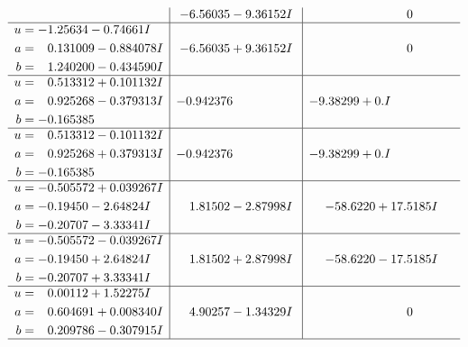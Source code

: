 \documentclass[1p]{elsarticle_modified}
\theoremstyle{definition}
\begin{document}
$$\begin{array}{c|c|c}
 & -6.56035 - 9.36152 I & \phantom{-0.000000 } 0 \\ \hline\begin{aligned}
u &= -1.25634 - 0.74661 I \\
a &= \phantom{-}0.131009 - 0.884078 I \\
b &= \phantom{-}1.240200 - 0.434590 I\end{aligned}
 & -6.56035 + 9.36152 I & \phantom{-0.000000 } 0 \\ \hline\begin{aligned}
u &= \phantom{-}0.513312 + 0.101132 I \\
a &= \phantom{-}0.925268 - 0.379313 I \\
b &= -0.165385\phantom{ +0.000000I}\end{aligned}
 & -0.942376\phantom{ +0.000000I} & -9.38299 + 0. I\phantom{ +0.000000I} \\ \hline\begin{aligned}
u &= \phantom{-}0.513312 - 0.101132 I \\
a &= \phantom{-}0.925268 + 0.379313 I \\
b &= -0.165385\phantom{ +0.000000I}\end{aligned}
 & -0.942376\phantom{ +0.000000I} & -9.38299 + 0. I\phantom{ +0.000000I} \\ \hline\begin{aligned}
u &= -0.505572 + 0.039267 I \\
a &= -0.19450 - 2.64824 I \\
b &= -0.20707 - 3.33341 I\end{aligned}
 & \phantom{-}1.81502 - 2.87998 I & -58.6220 + 17.5185 I \\ \hline\begin{aligned}
u &= -0.505572 - 0.039267 I \\
a &= -0.19450 + 2.64824 I \\
b &= -0.20707 + 3.33341 I\end{aligned}
 & \phantom{-}1.81502 + 2.87998 I & -58.6220 - 17.5185 I \\ \hline\begin{aligned}
u &= \phantom{-}0.00112 + 1.52275 I \\
a &= \phantom{-}0.604691 + 0.008340 I \\
b &= \phantom{-}0.209786 - 0.307915 I\end{aligned}
 & \phantom{-}4.90257 - 1.34329 I & \phantom{-0.000000 } 0\\
 \hline 
 \end{array}$$\newpage$$\begin{array}{c|c|c}  

\end{array}$$
\end{document}

